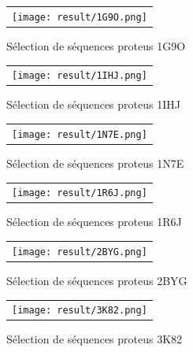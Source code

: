     \clearpage


   \begin{figure}[t]
     \centering
     \begin{tabular}{c}
       \texttt{[image: result/1G9O.png]} \\
     \end{tabular}
     \caption{Sélection de séquences proteus 1G9O }
\label{result:1G9O}
   \end{figure}

   \begin{figure}[t]
     \centering
     \begin{tabular}{c}
       \texttt{[image: result/1IHJ.png]} \\
     \end{tabular}
     \caption{Sélection de séquences proteus 1IHJ }
\label{result:1IHJ}
   \end{figure}

    \clearpage
   \begin{figure}[t]
     \centering
     \begin{tabular}{c}
       \texttt{[image: result/1N7E.png]} \\
     \end{tabular}
     \caption{Sélection de séquences proteus 1N7E }
\label{result:1N7E}
   \end{figure}

   \begin{figure}[t]
     \centering
     \begin{tabular}{c}
       \texttt{[image: result/1R6J.png]} \\
     \end{tabular}
     \caption{Sélection de séquences proteus 1R6J }
\label{result:1R6J}
   \end{figure}

    \clearpage

   \begin{figure}[t]
     \centering
     \begin{tabular}{c}
       \texttt{[image: result/2BYG.png]} \\
     \end{tabular}
     \caption{Sélection de séquences proteus 2BYG }
\label{result:2BYG}
   \end{figure}

   \begin{figure}[t]
     \centering
     \begin{tabular}{c}
       \texttt{[image: result/3K82.png]} \\
     \end{tabular}
     \caption{Sélection de séquences proteus 3K82 }
\label{result:3K82}
   \end{figure}

